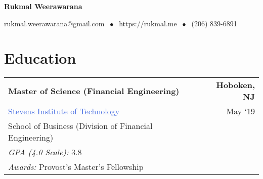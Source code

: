 \documentclass[10pt]{article}
\newcommand{\highlightcolor}{RoyalBlue}
\newcommand{\tabularxwidth}{\textwidth}
\begin{document}
    \centerline{ \color{\highlightcolor} \huge \textbf{Rukmal Weerawarana}}

    \vspace{.5em}

    {\color{\highlightcolor} \centerline{rukmal.weerawarana@gmail.com $\; \bullet \;$ https://rukmal.me $\; \bullet \;$ (206) 839-6891} }

    \noindent{\rule{\linewidth}{.2em}}



    
        \section{Education}

    
        \begin{tabularx}{\tabularxwidth}{X r}
            \textbf{Master of Science (Financial Engineering)} & \textbf{
    Hoboken, 
        NJ} \\
            \quad \textcolor{\highlightcolor}{Stevens Institute of Technology} & 
    May ‘19 \\
            \quad School of Business (Division of Financial Engineering) & \\
            
                \quad \textit{GPA (4.0 Scale):} 3.8 & \\
            
            
                
                    
                        \quad \textit{Awards:} 
    Provost's Master's Fellowship & \\
                    
                
                    
                
                    
                
            
        \end{tabularx}

        
\end{document}

